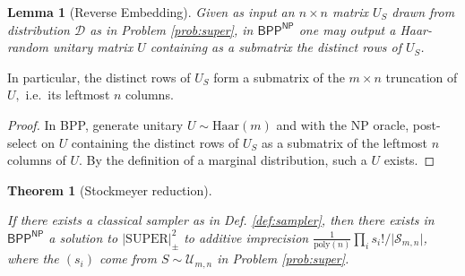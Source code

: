 \documentclass[11pt]{article}
\theoremstyle{plain}
\theoremstyle{plain}
\newtheorem{lem}{Lemma}
\theoremstyle{plain}
\newtheorem*{thm*}{Theorem}
\theoremstyle{plain}
\theoremstyle{plain}
\theoremstyle{plain}
\theoremstyle{plain}
\theoremstyle{remark}
\theoremstyle{remark}
\theoremstyle{plain}
\theoremstyle{plain}
\theoremstyle{plain}
\theoremstyle{plain}
\newcommand{\Haar}{\mathrm{Haar}}
\newcommand{\superap}{\lvert \mathrm{SUPER}\rvert^2_\pm}
\newcommand{\Smn}{\mathcal{S}_{m,n}}
\newcommand\poly[1]{\mathrm{poly}(#1)}
\begin{document}
\begin{lem}[Reverse Embedding]\label{lem:reverse-embedding}
    Given as input an $n\times n$ matrix $U_S$ drawn from distribution $\mathcal{D}$ as in Problem \ref{prob:super}, in $\mathsf{BPP}^\mathsf{NP}$ one may output a Haar-random unitary matrix $U$ containing as a submatrix the distinct rows of $U_S$.
\end{lem}
In particular, the distinct rows of $U_S$ form a submatrix of the $m \times n$ truncation of $U,$ i.e.\ its leftmost $n$ columns.

\begin{proof}
    In \textsf{BPP}, generate unitary $U\sim\Haar(m)$ and with the \textsf{NP} oracle, post-select on $U$ containing the distinct rows of $U_S$ as a submatrix of the leftmost $n$ columns of $U.$ By the definition of a marginal distribution, such a $U$ exists.
\end{proof}

\begin{thm*}[Stockmeyer reduction] \label{thm:stockmeyer}

If there exists a classical sampler as in Def. \ref{def:sampler}, then there exists in $\mathsf{BPP}^\mathsf{NP}$ a solution to $\superap$ to additive imprecision $\frac{1}{\poly{n}}\prod_i s_i!/\vert\Smn\vert$, where the $(s_i)$ come from $S\sim\mathcal U_{m,n}$ in Problem \ref{prob:super}. 
\end{thm*}
\end{document}
